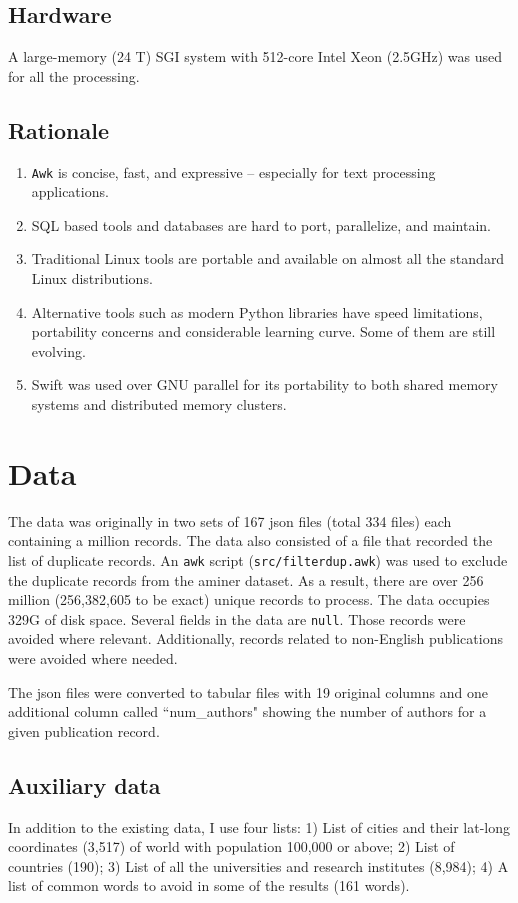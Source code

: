 \documentclass{article}
\begin{document}
\subsection*{Hardware}
A large-memory (24 T) SGI system with 512-core Intel Xeon (2.5GHz) was used for
all the processing.

\subsection*{Rationale}
\begin{enumerate}
\item \texttt{Awk} is concise, fast, and expressive -- especially for text processing applications.
\item SQL based tools and databases are hard to port, parallelize, and maintain.
\item Traditional Linux tools are portable and available on almost all the standard Linux distributions.
\item Alternative tools such as modern Python libraries have speed limitations, portability concerns and considerable learning curve. Some of them are still evolving.
\item Swift was used over GNU parallel for its portability to both shared memory systems and distributed memory clusters.
\end{enumerate}

\section*{Data}
The data was originally in two sets of 167 json files (total 334 files) each
containing a million records. The data also consisted of a file that recorded
the list of duplicate records. An \texttt{awk} script
(\texttt{src/filterdup.awk}) was used to exclude the duplicate records from the
aminer dataset. As a result, there are over 256 million (256,382,605 to be
exact) unique records to process. The data occupies 329G of disk space. Several
fields in the data are \texttt{null}. Those records were avoided where
relevant. Additionally, records related to non-English publications were
avoided where needed.

The json files were converted to tabular files with 19 original columns and one
additional column called ``num\_authors" showing the number of authors for a given
publication record.

\subsection*{Auxiliary data}
In addition to the existing data, I use four lists: 1) List of cities and their
lat-long coordinates (3,517) of world with population 100,000 or above; 2) List
of countries (190); 3) List of all the universities and research institutes
(8,984); 4) A list of common words to avoid in some of the results (161 words).
\end{document}
